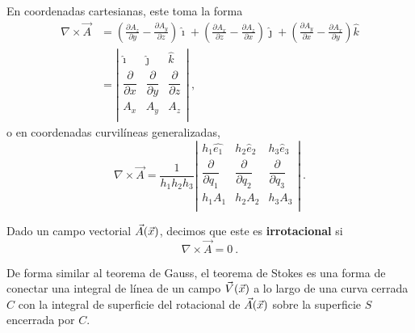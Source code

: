En coordenadas cartesianas, este toma la forma 
\begin{align}
    \nonumber \nabla \times \vec{A} & = \left( \frac{\partial A_z}{\partial y} - \frac{\partial A_y}{\partial z} \right) \hat{\imath} + \left( \frac{\partial A_x}{\partial z} - \frac{\partial A_z}{\partial x} \right) \hat{\jmath} + \left( \frac{\partial A_y}{\partial x} - \frac{\partial A_x}{\partial y} \right) \hat{k} \\
    & = \left|
    \begin{array}{ccc}
        \hat{\imath} & \hat{\jmath} & \hat{k} \\
        \dfrac{\partial}{\partial x} & \dfrac{\partial}{\partial y} & \dfrac{\partial}{\partial z} \\
        A_x & A_y & A_z \\
    \end{array}
    \right| \ ,
\end{align}
o en coordenadas curvilíneas generalizadas,
\begin{equation}
    \nabla \times \vec{A} = \frac{1}{h_1 h_2 h_3} \left| 
    \begin{array}{ccc}
        h_1 \hat{e_1} & h_2 \hat{e}_2 & h_3 \hat{e}_3 \\
        \dfrac{\partial}{\partial q_1} & \dfrac{\partial}{\partial q_2} & \dfrac{\partial}{\partial q_3} \\
        h_1 A_1 & h_2 A_2 & h_3 A_3 \\
    \end{array}
    \right| \ .
\end{equation}

\begin{defi}
    Dado un campo vectorial $\vec{A}(\vec{x})$, decimos que este es \textbf{irrotacional} si 
    \begin{equation}
        \nabla \times \vec{A} = 0 \ .
    \end{equation}
\end{defi}


De forma similar al teorema de Gauss, el teorema de Stokes es una forma de conectar una integral de línea de un campo $\vec{V}(\vec{x})$ a lo largo de una curva cerrada $C$ con la integral de superficie del rotacional de $\vec{A}(\vec{x})$ sobre la superficie $S$ encerrada por $C$.

